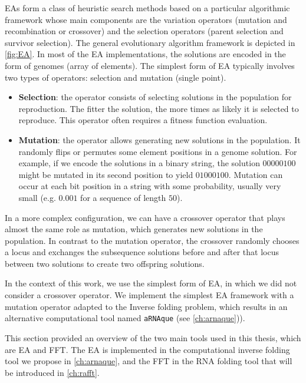\acp{EA} form a class of heuristic search methods based on a particular
algorithmic framework whose main components are the variation operators
(mutation and recombination or crossover) and the selection operators (parent
selection and survivor selection). The general evolutionary algorithm framework is depicted in \autoref{fig:EA}. In most of the \ac{EA} implementations, the solutions are encoded in the form of genomes (array of elements). The simplest form of \ac{EA} typically involves two types of operators: selection and mutation (single point). 

\begin{itemize}
	\item \textbf{Selection}: the operator consists of selecting solutions in the population for reproduction. The fitter the solution, the more times as likely it is selected to reproduce. This operator often requires a fitness function evaluation.
	\item \textbf{Mutation}: the operator allows generating new solutions in the population. It randomly flips or permutes some element positions in a genome solution.  
	For example, if we encode the solutions in a binary string, the solution $00000100$ might be mutated in its second position to yield $01000100$. Mutation can occur at each bit position in a string with some probability, usually very small (e.g. $0.001$ for a sequence of length $50$).
\end{itemize}

In a more complex configuration, we can have a crossover operator that plays almost the same role as mutation, which generates new solutions in the population. In contrast to the mutation operator,  the crossover randomly chooses a locus and exchanges the subsequence solutions before and after that locus between two solutions to create two offspring solutions. 

In the context of this work, we use the simplest form of \ac{EA}, in which we did not consider a crossover operator. We implement the simplest \ac{EA} framework with a mutation operator adapted to the Inverse folding problem, which results in an alternative computational tool named \texttt{aRNAque} (see \autoref{ch:arnaque})).

This section provided an overview of the two main tools used in this thesis, which are \ac{EA} and \ac{FFT}. The \ac{EA} is implemented in the computational inverse folding tool we propose in \autoref{ch:arnaque}, and the \ac{FFT} in the \ac{RNA} folding tool that will be introduced in \autoref{ch:rafft}. 
